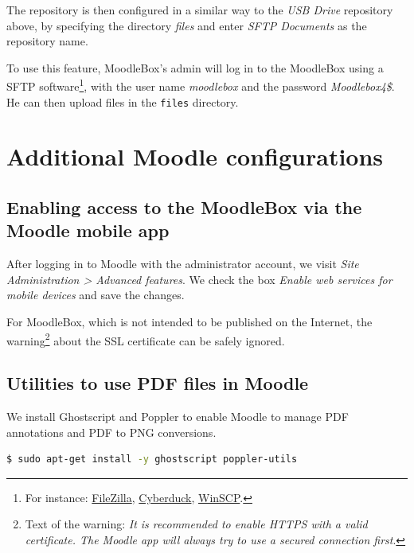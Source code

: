 \documentclass[12pt]{article}
\begin{document}
The repository is then configured in a similar way to the \textsl{USB Drive} repository above, by specifying the directory \emph{files} and enter \emph{SFTP Documents} as the repository name.

To use this feature, MoodleBox's admin will log in to the MoodleBox using a SFTP software\footnote{For instance: \href{https://filezilla-project.org/}{FileZilla}, \href{https://cyberduck.io/}{Cyberduck}, \href{http://winscp.net/}{WinSCP}.}, with the user name \emph{moodlebox} and the password \emph{Moodlebox4\$}.
He can then upload files in the \lstinline{files} directory.

\section{Additional Moodle configurations}

\subsection{Enabling access to the MoodleBox via the Moodle mobile app}

After logging in to Moodle with the administrator account, we visit \textsl{Site Administration > Advanced features}.
We check the box \emph{Enable web services for mobile devices} and save the changes.

For MoodleBox, which is not intended to be published on the Internet, the warning\footnote{Text of the warning: \textsl{It is recommended to enable HTTPS with a valid certificate. The Moodle app will always try to use a secured connection first}.} about the SSL certificate can be safely ignored.

\subsection{Utilities to use PDF files in Moodle}

We install Ghostscript and Poppler to enable Moodle to manage PDF annotations and PDF to PNG conversions.
\begin{lstlisting}[language=bash]
$ sudo apt-get install -y ghostscript poppler-utils
\end{lstlisting}
\end{document}
